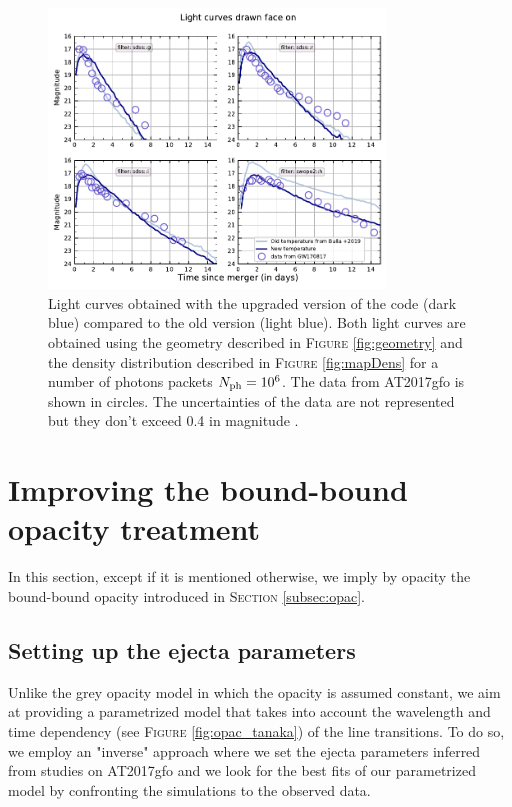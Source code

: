 \documentclass[a4paper, twoside, 11pt]{article}
\numberwithin{equation}{section}
\begin{document}
\begin{figure}[h!]
\centering
\includegraphics[width=0.8\textwidth]{pictures/lc_oldPossis_vs_NewPossis_1e6.pdf}
\caption[Light curves with the new estimation of temperature]{Light curves obtained with the upgraded version of the code (dark blue) compared to the old version \cite{POSSIS_2019}  (light blue). Both light curves are obtained using the geometry described in  F\textsc{igure} \ref{fig:geometry} and the density distribution described in  F\textsc{igure} \ref{fig:mapDens} for a number of photons packets $N_{\rm{ph}}= 10^6$. The data from AT2017gfo is shown in circles. The uncertainties of the data are not represented but they don't exceed 0.4 in magnitude \cite{MHD}.}
\label{fig:lightCurvesTemp}
\end{figure}


\clearpage 
\section{Improving the bound-bound opacity treatment}
\label{sec:OpacWork}
\hspace{\parindent}	  In this section, except if it is mentioned otherwise, we imply by opacity the bound-bound opacity introduced in S\textsc{ection} \ref{subsec:opac}.
\subsection{Setting up the ejecta parameters}
\label{subsec:ejecta_para}
\hspace{\parindent}	 Unlike the grey opacity model in which the opacity is assumed constant, we aim at providing a parametrized model that takes into account the wavelength and time dependency (see F\textsc{igure} \ref{fig:opac_tanaka}) of the line transitions. To do so, we employ an "inverse" approach where we set the ejecta parameters inferred from studies on  AT2017gfo and we look for the best fits of our parametrized model by confronting the simulations to the observed data. \\
\end{document}
